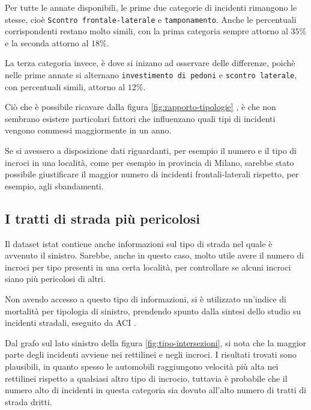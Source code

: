 \documentclass[a4paper]{report}
\newcommand{\columnstyle}[1]{\texttt{#1}}
\begin{document}
Per tutte le annate disponibili, le prime due categorie di incidenti rimangono 
le stesse, cioè \columnstyle{Scontro frontale-laterale} e \columnstyle{tamponamento}. 
Anche le percentuali corrispondenti restano molto simili, con la prima 
categoria sempre attorno al $35\%$ e la seconda attorno al $18\%$.

La terza categoria invece, è dove si inizano ad osservare delle differenze, 
poichè nelle prime annate si alternano \columnstyle{investimento di pedoni} e 
\columnstyle{scontro laterale}, con percentuali simili, attorno al $12\%$.

Ciò che è possibile ricavare dalla figura \ref{fig:rapporto-tipologie} , è che non 
sembrano esistere particolari fattori che influenzano quali tipi di incidenti 
vengono commessi maggiormente in un anno. 

Se si avessero a disposizione dati riguardanti, per esempio il numero e il tipo 
di incroci in una località, come per esempio in provincia di Milano, sarebbe stato 
possibile giustificare il maggior numero di incidenti frontali-laterali rispetto, 
per esempio, agli sbandamenti.


\subsection{I tratti di strada più pericolosi}

Il dataset istat contiene anche informazioni sul tipo di strada nel quale è avvenuto il 
sinistro.
Sarebbe, anche in questo caso, molto utile avere il numero di incroci per tipo 
presenti in una certa località, per controllare se alcuni incroci siano più 
pericolosi di altri.

Non avendo accesso a questo tipo di informazioni, si è utilizzato un'indice di 
mortalità per tipologia di sinistro, prendendo spunto dalla sintesi dello 
studio su incidenti stradali, eseguito da ACI \cite{ACI:2}.

Dal grafo sul lato sinistro della figura \ref{fig:tipo-intersezioni}, 
si nota che la maggior parte degli incidenti avviene nei rettilinei e negli incroci.
I risultati trovati sono plausibili, in quanto spesso le automobili raggiungono 
velocità più alta nei rettilinei rispetto a qualsiasi altro tipo di incrocio, 
tuttavia è probabile che il numero alto di incidenti in questa categoria sia dovuto 
all'alto numero di tratti di strada dritti.
\end{document}
